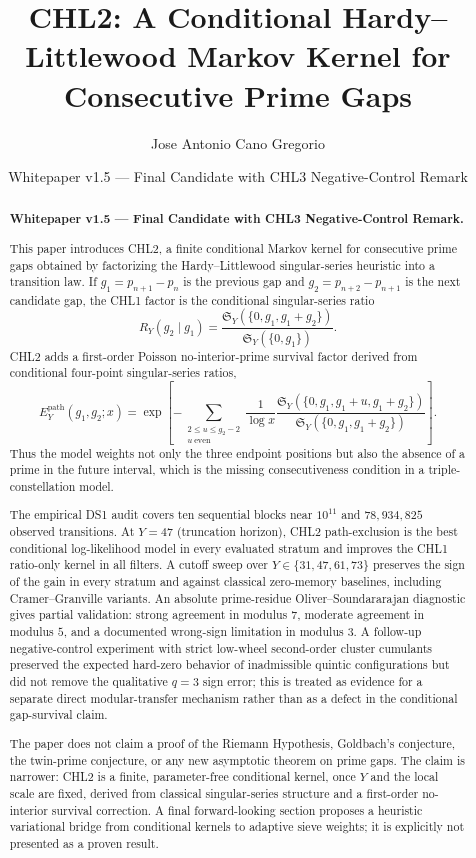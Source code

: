 \documentclass[10pt]{article}
\title{CHL2: A Conditional Hardy--Littlewood Markov Kernel for Consecutive Prime Gaps}
\author{Jose Antonio Cano Gregorio}
\date{Whitepaper v1.5 --- Final Candidate with CHL3 Negative-Control Remark}
\newcommand{\SY}{\mathfrak{S}_Y}
\newcommand{\Epath}{E_Y^{\mathrm{path}}}
\begin{document}
\maketitle
\begin{abstract}
\noindent\textbf{Whitepaper v1.5 --- Final Candidate with CHL3 Negative-Control Remark.}\par
This paper introduces CHL2, a finite conditional Markov kernel for consecutive prime gaps obtained by factorizing the Hardy--Littlewood singular-series heuristic into a transition law.  If $g_1=p_{n+1}-p_n$ is the previous gap and $g_2=p_{n+2}-p_{n+1}$ is the next candidate gap, the CHL1 factor is the conditional singular-series ratio
\[
R_Y(g_2\mid g_1)=\frac{\SY(\{0,g_1,g_1+g_2\})}{\SY(\{0,g_1\})}.
\]
CHL2 adds a first-order Poisson no-interior-prime survival factor derived from conditional four-point singular-series ratios,
\[
\Epath(g_1,g_2;x)=\exp\!\left[-\sum_{\substack{2\le u\le g_2-2\\u\ \mathrm{even}}}\frac{1}{\log x}\frac{\SY(\{0,g_1,g_1+u,g_1+g_2\})}{\SY(\{0,g_1,g_1+g_2\})}\right].
\]
Thus the model weights not only the three endpoint positions but also the absence of a prime in the future interval, which is the missing consecutiveness condition in a triple-constellation model.

The empirical DS1 audit covers ten sequential blocks near $10^{11}$ and $78{,}934{,}825$ observed transitions. At $Y=47$ (truncation horizon), CHL2 path-exclusion is the best conditional log-likelihood model in every evaluated stratum and improves the CHL1 ratio-only kernel in all filters. A cutoff sweep over $Y\in\{31,47,61,73\}$ preserves the sign of the gain in every stratum and against classical zero-memory baselines, including Cramer--Granville variants. An absolute prime-residue Oliver--Soundararajan diagnostic gives partial validation: strong agreement in modulus $7$, moderate agreement in modulus $5$, and a documented wrong-sign limitation in modulus $3$. A follow-up negative-control experiment with strict low-wheel second-order cluster cumulants preserved the expected hard-zero behavior of inadmissible quintic configurations but did not remove the qualitative $q=3$ sign error; this is treated as evidence for a separate direct modular-transfer mechanism rather than as a defect in the conditional gap-survival claim.

The paper does not claim a proof of the Riemann Hypothesis, Goldbach's conjecture, the twin-prime conjecture, or any new asymptotic theorem on prime gaps. The claim is narrower: CHL2 is a finite, parameter-free conditional kernel, once $Y$ and the local scale are fixed, derived from classical singular-series structure and a first-order no-interior survival correction. A final forward-looking section proposes a heuristic variational bridge from conditional kernels to adaptive sieve weights; it is explicitly not presented as a proven result.
\end{abstract}
\tableofcontents
\listoffigures
\newpage
\end{document}
